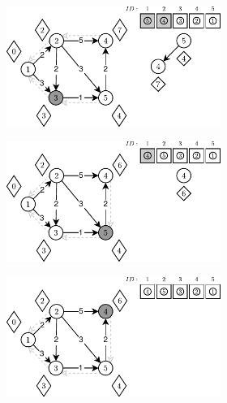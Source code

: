 \begin{figure}[!htbp]
\begin{subfigure}[b]{\textwidth}
\begin{subfigure}[b]{0.325\textwidth}
			\caption{}
			\label{fig:exampleDHeap:c}
		\end{subfigure}
		\hfill\null
	\end{subfigure}
	\begin{subfigure}[b]{\textwidth}
		\null\hfill
		\begin{subfigure}[b]{0.325\textwidth}
			\includegraphics[width=\textwidth]{Chapter_II/R-HEAP-Example/d.pdf}
			\caption{}
			\label{fig:exampleDHeap:d}
		\end{subfigure}
		\hfill
		\begin{subfigure}[b]{0.325\textwidth}
			\includegraphics[width=\textwidth]{Chapter_II/R-HEAP-Example/e.pdf}
			\caption{}
			\label{fig:exampleDHeap:e}
		\end{subfigure}
		\hfill
		\begin{subfigure}[b]{0.325\textwidth}
			\includegraphics[width=\textwidth]{Chapter_II/R-HEAP-Example/f.pdf}

\end{subfigure}
\end{subfigure}
\end{figure}
